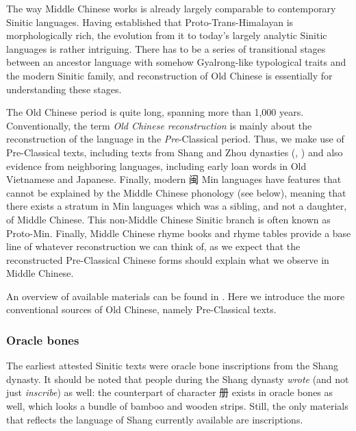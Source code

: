 \documentclass[UTF8, a4paper, oneside, scheme=plain, 12pt]{ctexrep}
\newcommand*{\citechap}[1]{Ch.~{#1}}
\newcommand*{\term}[1]{\emph{#1}}
\begin{document}
The way Middle Chinese works is already largely comparable to contemporary Sinitic languages.
Having established that Proto-Trans-Himalayan is morphologically rich,
the evolution from it to today's largely analytic Sinitic languages is rather intriguing.
There has to be a series of transitional stages between an ancestor language with somehow Gyalrong-like typological traits and the modern Sinitic family,
and reconstruction of Old Chinese is essentially
for understanding these stages.

The Old Chinese period is quite long, spanning more than 1,000 years.
Conventionally, the term \term{Old Chinese reconstruction} is mainly about the reconstruction of the language in the \emph{Pre}-Classical period.
Thus, we make use of Pre-Classical texts, including texts from Shang and Zhou dynasties (, ) and also evidence from neighboring languages,
including early loan words in Old Vietnamese and Japanese.
Finally, modern 闽 Min languages have features that cannot be explained by
the Middle Chinese phonology (see below),
meaning that there exists a stratum in Min languages
which was a sibling, and not a daughter, of Middle Chinese.
This non-Middle Chinese Sinitic branch is often known as Proto-Min.
Finally, Middle Chinese rhyme books and rhyme tables provide a base line
of whatever reconstruction we can think of,
as we expect that the reconstructed Pre-Classical Chinese forms
should explain what we observe in Middle Chinese.

An overview of available materials can be found in \citet[\citechap{2}]{baxter2014old}.
Here we introduce the more conventional sources of Old Chinese,
namely Pre-Classical texts.

\subsubsection{Oracle bones}\label{sec:intro.pre-classical.shang}

The earliest attested Sinitic texts were oracle bone inscriptions from the Shang dynasty.
It should be noted that people during the Shang dynasty \emph{wrote} (and not just \emph{inscribe}) as well:
the counterpart of character 册 exists in oracle bones as well,
which looks a bundle of bamboo and wooden strips.
Still, the only materials that reflects the language of Shang currently available are inscriptions.
\end{document}
